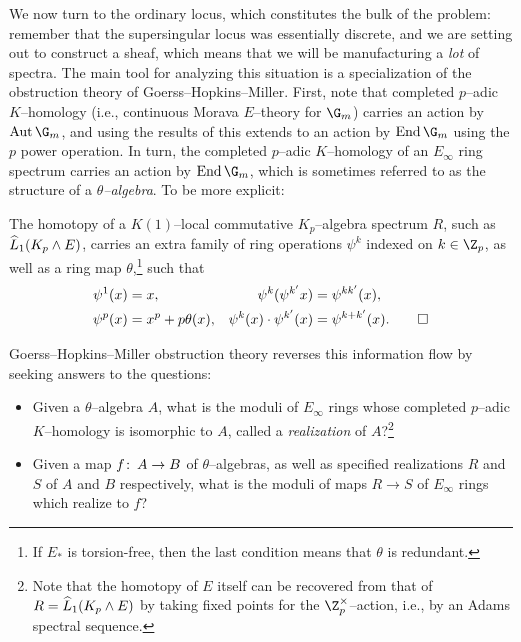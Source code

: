 We now turn to the ordinary locus, which constitutes the bulk of the problem: remember that the supersingular locus was essentially discrete, and we are setting out to construct a sheaf, which means that we will be manufacturing a \emph{lot} of spectra.  The main tool for analyzing this situation is a specialization of the obstruction theory of Goerss--Hopkins--Miller.  First, note that completed $p$--adic $K$--homology (i.e., continuous Morava $E$--theory for $\G_m$) carries an action by $\Aut \G_m$, and using the results of  this extends to an action by $\End \G_m$ using the $p${\th} power operation.  In turn, the completed $p$--adic $K$--homology of an $E_\infty$ ring spectrum carries an action by $\End \G_m$, which is sometimes referred to as the structure of a \textit{$\theta$--algebra}.  To be more explicit:
\begin{theorem}
The homotopy of a $K(1)$--local commutative $K_p$--algebra spectrum $R$, such as $\widehat L_1 (K_p \wedge E)$, carries an extra family of ring operations $\psi^k$ indexed on $k \in \Z_p$, as well as a ring map $\theta$,\footnote{If $E_*$ is torsion-free, then the last condition means that $\theta$ is redundant.} such that
\pushQED{\qed}
\begin{align*}
\psi^1(x) & = x, &
\psi^k (\psi^{k'} x) & = \psi^{kk'}(x), \\
\psi^p(x) & = x^p + p\theta(x), &
\psi^k(x) \cdot \psi^{k'}(x) & = \psi^{k + k'}(x). \qedhere
\end{align*}
\popQED
\end{theorem}
\noindent Goerss--Hopkins--Miller obstruction theory reverses this information flow by seeking answers to the questions:
\begin{itemize}
    \item Given a $\theta$--algebra $A$, what is the moduli of $E_\infty$ rings whose completed $p$--adic $K$--homology is isomorphic to $A$, called a \textit{realization} of $A$?\footnote{Note that the homotopy of $E$ itself can be recovered from that of $R = \widehat L_1 (K_p \wedge E)$ by taking fixed points for the $\Z_p^\times$--action, i.e., by an Adams spectral sequence.}
    \item Given a map $f\colon\thinspace A \to B$ of $\theta$--algebras, as well as specified realizations $R$ and $S$ of $A$ and $B$ respectively, what is the moduli of maps $R \to S$ of $E_\infty$ rings which realize to $f$?
\end{itemize}

